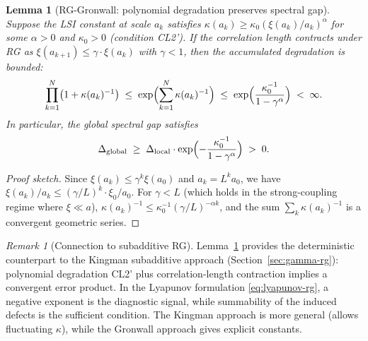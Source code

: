 \documentclass[12pt,a4paper]{article}
\theoremstyle{definition}
\theoremstyle{plain}
\newtheorem{lemma}[definition]{Lemma}
\theoremstyle{remark}
\newtheorem{remark}[definition]{Remark}
\begin{document}
\begin{lemma}[RG-Gronwall: polynomial degradation preserves spectral gap]\label{lem:rg-gronwall}
Suppose the LSI constant at scale $a_k$ satisfies $\kappa(a_k) \geq \kappa_0 (\xi(a_k)/a_k)^\alpha$ for some $\alpha > 0$ and $\kappa_0 > 0$ (condition CL2'). If the correlation length contracts under RG as $\xi(a_{k+1}) \leq \gamma \cdot \xi(a_k)$ with $\gamma < 1$, then the accumulated degradation is bounded:
\begin{equation}\label{eq:rg-gronwall}
  \prod_{k=1}^{N} \bigl(1 + \kappa(a_k)^{-1}\bigr) \;\leq\; \exp\Bigl(\sum_{k=1}^{N} \kappa(a_k)^{-1}\Bigr) \;\leq\; \exp\Bigl(\frac{\kappa_0^{-1}}{1 - \gamma^\alpha}\Bigr) \;<\; \infty.
\end{equation}
In particular, the global spectral gap satisfies
\[
  \Delta_{\mathrm{global}} \;\geq\; \Delta_{\mathrm{local}} \cdot \exp\Bigl(-\frac{\kappa_0^{-1}}{1 - \gamma^\alpha}\Bigr) \;>\; 0.
\]
\end{lemma}

\begin{proof}[Proof sketch]
Since $\xi(a_k) \leq \gamma^k \xi(a_0)$ and $a_k = L^k a_0$, we have $\xi(a_k)/a_k \leq (\gamma/L)^k \cdot \xi_0/a_0$. For $\gamma < L$ (which holds in the strong-coupling regime where $\xi \ll a$), $\kappa(a_k)^{-1} \leq \kappa_0^{-1} (\gamma/L)^{-\alpha k}$, and the sum $\sum_k \kappa(a_k)^{-1}$ is a convergent geometric series.
\end{proof}

\begin{remark}[Connection to subadditive RG]\label{rem:gronwall-kingman}
Lemma~\ref{lem:rg-gronwall} provides the deterministic counterpart to the Kingman subadditive approach (Section~\ref{sec:gamma-rg}): polynomial degradation CL2' plus correlation-length contraction implies a convergent error product. In the Lyapunov formulation \eqref{eq:lyapunov-rg}, a negative exponent is the diagnostic signal, while summability of the induced defects is the sufficient condition. The Kingman approach is more general (allows fluctuating $\kappa$), while the Gronwall approach gives explicit constants.
\end{remark}
\end{document}
